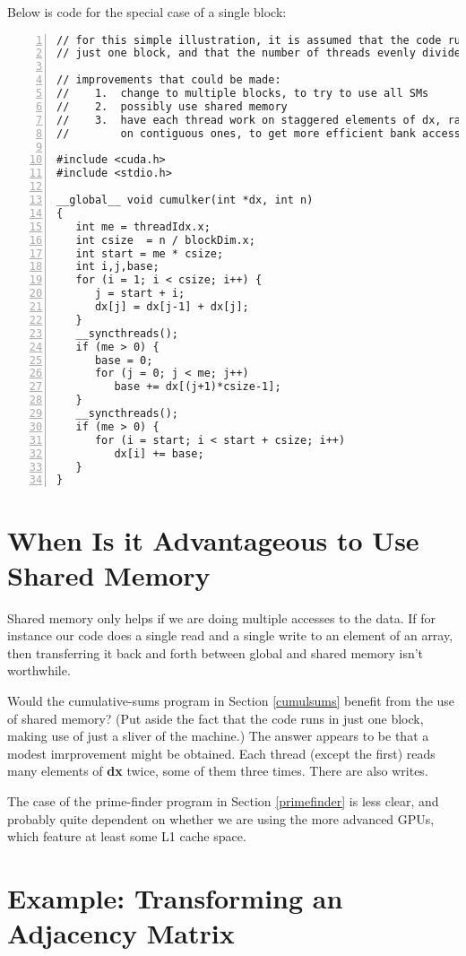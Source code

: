 Below is code for the special case of a single block:

\begin{lstlisting}[numbers=left]
// for this simple illustration, it is assumed that the code runs in
// just one block, and that the number of threads evenly divides n

// improvements that could be made:
//    1.  change to multiple blocks, to try to use all SMs
//    2.  possibly use shared memory
//    3.  have each thread work on staggered elements of dx, rather than
//        on contiguous ones, to get more efficient bank access

#include <cuda.h>
#include <stdio.h>

__global__ void cumulker(int *dx, int n)
{  
   int me = threadIdx.x;
   int csize  = n / blockDim.x;
   int start = me * csize;
   int i,j,base;
   for (i = 1; i < csize; i++) {
      j = start + i;
      dx[j] = dx[j-1] + dx[j];
   }
   __syncthreads();
   if (me > 0) {
      base = 0;
      for (j = 0; j < me; j++)
         base += dx[(j+1)*csize-1];
   }
   __syncthreads();
   if (me > 0) {
      for (i = start; i < start + csize; i++)
         dx[i] += base;
   }
}
\end{lstlisting}

\section{When Is it Advantageous to Use Shared Memory}

Shared memory only helps if we are doing multiple accesses to the data.
If for instance our code does a single read and a single write to an
element of an array, then transferring it back and forth between global
and shared memory isn't worthwhile.

Would the cumulative-sums program in Section \ref{cumulsums} benefit
from the use of shared memory?  (Put aside the fact that the code runs
in just one block, making use of just a sliver of the machine.)  The
answer appears to be that a modest imrprovement might be obtained.  Each
thread (except the first) reads many elements of {\bf dx} twice, some of
them three times.  There are also writes.

The case of the prime-finder program in Section \ref{primefinder} is
less clear, and probably quite dependent on whether we are using the
more advanced GPUs, which feature at least some L1 cache space.

\section{Example:  Transforming an Adjacency Matrix}
\label{transgraph1}

